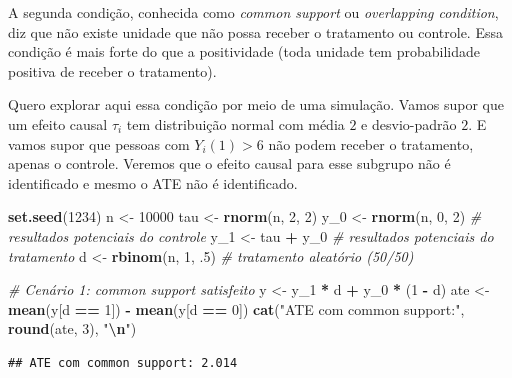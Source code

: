 \documentclass[
]{article}
\newenvironment{Shaded}{\begin{snugshade}}{\end{snugshade}}
\newcommand{\CommentTok}[1]{\textcolor[rgb]{0.56,0.35,0.01}{\textit{#1}}}
\newcommand{\DecValTok}[1]{\textcolor[rgb]{0.00,0.00,0.81}{#1}}
\newcommand{\FunctionTok}[1]{\textcolor[rgb]{0.13,0.29,0.53}{\textbf{#1}}}
\newcommand{\NormalTok}[1]{#1}
\newcommand{\OtherTok}[1]{\textcolor[rgb]{0.56,0.35,0.01}{#1}}
\newcommand{\SpecialCharTok}[1]{\textcolor[rgb]{0.81,0.36,0.00}{\textbf{#1}}}
\newcommand{\StringTok}[1]{\textcolor[rgb]{0.31,0.60,0.02}{#1}}
\begin{document}
A segunda condição, conhecida como \emph{common support} ou \emph{overlapping condition}, diz que não existe unidade que não possa receber o tratamento ou controle. Essa condição é mais forte do que a positividade (toda unidade tem probabilidade positiva de receber o tratamento).

Quero explorar aqui essa condição por meio de uma simulação. Vamos supor que um efeito causal \(\tau_i\) tem distribuição normal com média \(2\) e desvio-padrão \(2\). E vamos supor que pessoas com \(Y_i(1) > 6\) não podem receber o tratamento, apenas o controle. Veremos que o efeito causal para esse subgrupo não é identificado e mesmo o ATE não é identificado.

\begin{Shaded}
\begin{Highlighting}[]
\FunctionTok{set.seed}\NormalTok{(}\DecValTok{1234}\NormalTok{)}
\NormalTok{n }\OtherTok{\textless{}{-}} \DecValTok{10000}
\NormalTok{tau }\OtherTok{\textless{}{-}} \FunctionTok{rnorm}\NormalTok{(n, }\DecValTok{2}\NormalTok{, }\DecValTok{2}\NormalTok{)}
\NormalTok{y\_0 }\OtherTok{\textless{}{-}} \FunctionTok{rnorm}\NormalTok{(n, }\DecValTok{0}\NormalTok{, }\DecValTok{2}\NormalTok{) }\CommentTok{\# resultados potenciais do controle}
\NormalTok{y\_1 }\OtherTok{\textless{}{-}}\NormalTok{ tau }\SpecialCharTok{+}\NormalTok{ y\_0      }\CommentTok{\# resultados potenciais do tratamento}
\NormalTok{d }\OtherTok{\textless{}{-}} \FunctionTok{rbinom}\NormalTok{(n, }\DecValTok{1}\NormalTok{, .}\DecValTok{5}\NormalTok{) }\CommentTok{\# tratamento aleatório (50/50)}

\CommentTok{\# Cenário 1: common support satisfeito}
\NormalTok{y }\OtherTok{\textless{}{-}}\NormalTok{ y\_1 }\SpecialCharTok{*}\NormalTok{ d }\SpecialCharTok{+}\NormalTok{ y\_0 }\SpecialCharTok{*}\NormalTok{ (}\DecValTok{1} \SpecialCharTok{{-}}\NormalTok{ d)}
\NormalTok{ate }\OtherTok{\textless{}{-}} \FunctionTok{mean}\NormalTok{(y[d }\SpecialCharTok{==} \DecValTok{1}\NormalTok{]) }\SpecialCharTok{{-}} \FunctionTok{mean}\NormalTok{(y[d }\SpecialCharTok{==} \DecValTok{0}\NormalTok{])}
\FunctionTok{cat}\NormalTok{(}\StringTok{"ATE com common support:"}\NormalTok{, }\FunctionTok{round}\NormalTok{(ate, }\DecValTok{3}\NormalTok{), }\StringTok{"}\SpecialCharTok{\textbackslash{}n}\StringTok{"}\NormalTok{)}
\end{Highlighting}
\end{Shaded}

\begin{verbatim}
## ATE com common support: 2.014
\end{verbatim}
\end{document}
